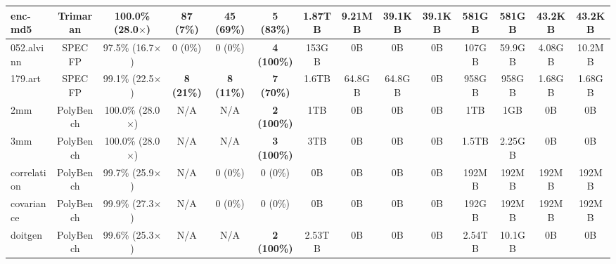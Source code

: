 {\begin{tabular}{|l|c|c||c|c||c||c|c|c|c||c|c|c|c|}
\hline
enc-md5    & Trimaran & 100.0\% (28.0$\times$) & \textbf{87 (7\%)} & \textbf{45 (69\%)} & \textbf{5 (83\%)} &
           1.87TB & 9.21MB & 39.1KB & 39.1KB & 581GB & 581GB & 43.2KB & 43.2KB \\ %
\hline
052.alvinn & SPEC FP  & 97.5\% (16.7$\times$) & 0 (0\%) & 0 (0\%) & \textbf{4 (100\%)} &
           153GB & 0B & 0B & 0B & 107GB & 59.9GB & 4.08GB & 10.2MB \\  %
\hline
179.art    & SPEC FP  & 99.1\% (22.5$\times$) & \textbf{8 (21\%)} & \textbf{8 (11\%)} & \textbf{7 (70\%)} &
           1.6TB & 64.8GB & 64.8GB & 0B & 958GB & 958GB & 1.68GB & 1.68GB \\ %
\hline
2mm        & PolyBench & 100.0\% (28.0$\times$)  & N/A & N/A & \textbf{2 (100\%)} &
           1TB & 0B & 0B & 0B & 1TB & 1GB & 0B & 0B \\ %
\hline
3mm        & PolyBench & 100.0\% (28.0$\times$)  & N/A & N/A & \textbf{3 (100\%)} &
           3TB & 0B & 0B & 0B & 1.5TB & 2.25GB & 0B & 0B \\ %
\hline
correlation & PolyBench & 99.7\% (25.9$\times$) & N/A & 0 (0\%)  & 0 (0\%) &
            0B & 0B & 0B & 0B & 192MB & 192MB & 192MB & 192MB \\ %
\hline
covariance & PolyBench & 99.9\% (27.3$\times$) & N/A & 0 (0\%) & 0 (0\%) &
           0B & 0B & 0B & 0B & 192GB & 192MB & 192MB & 192MB \\ %
\hline
doitgen   & PolyBench & 99.6\% (25.3$\times$) & N/A & N/A & \textbf{2 (100\%)} &
          2.53TB & 0B & 0B & 0B & 2.54TB & 10.1GB & 0B & 0B \\ %

\end{tabular}}
